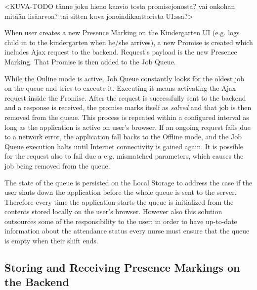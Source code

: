 <KUVA-TODO tänne joku hieno kaavio tosta promisejonosta? vai onkohan mitään lisäarvoa? tai sitten kuva jonoindikaattorista UI:ssa?>

When user creates a new Presence Marking on the Kindergarten UI (e.g. logs child in to the kindergarten when he/she arrives), a new Promise is created which includes Ajax request to the backend. Request's payload is the new Presence Marking. That Promise is then added to the Job Queue. 

While the Online mode is active, Job Queue constantly looks for the oldest job on the queue and tries to execute it. Executing it means activating the Ajax request inside the Promise. After the request is successfully sent to the backend and a response is received, the promise marks itself as \textit{solved} and that job is then removed from the queue. This process is repeated within a configured interval as long as the application is active on user's browser. If an ongoing request fails due to a network error, the application fall backs to the Offline mode, and the Job Queue execution halts until Internet connectivity is gained again. It is possible for the request also to fail due a e.g. mismatched parameters, which causes the job being removed from the queue.

The state of the queue is persisted on the Local Storage to address the case if the user shuts down the application before the whole queue is sent to the server. Therefore every time the application starts the queue is initialized from the contents stored locally on the user's browser. However also this solution outsources some of the responsibility to the user: in order to have up-to-date information about the attendance status every nurse must ensure that the queue is empty when their shift ends.  %




\subsection{Storing and Receiving Presence Markings on the Backend}


